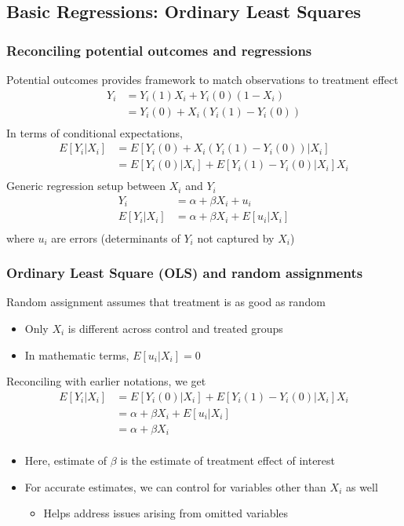 \documentclass[aspectratio=169]{beamer}
\begin{document}
\subsection{Basic Regressions: Ordinary Least Squares}
\begin{frame}
\frametitle{Reconciling potential outcomes and regressions} 
 Potential outcomes provides framework to match observations to treatment effect
\[ 
\begin{aligned}
Y_ i &= Y_i(1)X_i + Y_i(0)(1-X_i)\\
&=Y_i(0)+X_i(Y_i(1)-Y_i(0))\\
\end{aligned}
\]
In terms of conditional expectations, 
\[ 
\begin{aligned}
E[Y_ i|X_i ]&=E[Y_i(0)+X_i(Y_i(1)-Y_i(0)) |X_i]   \\
&=E[Y_i(0)|X_i]+E[Y_i(1)-Y_i(0)|X_i]X_i \\
\end{aligned}
\]
Generic regression setup between $X_i$ and $Y_i$
\[
\begin{aligned}
Y_i &=\alpha + \beta X_i + u_i   \\
E[Y_ i|X_i]&=\alpha + \beta X_i + E[u_i|X_i] \\
\end{aligned}
\]
where $u_i$ are errors (determinants of $Y_i$ not captured by $X_i$)
\end{frame}

\begin{frame}
\frametitle{Ordinary Least Square (OLS) and random assignments} 
Random assignment assumes that treatment is as good as random
\begin{itemize}\setlength\itemsep{3pt}
\item Only $X_i$ is different across control and treated groups
\item In mathematic terms, $E[u_i|X_i]=0$
\end{itemize} \medskip
Reconciling with earlier notations, we get
\[
\begin{aligned}
  E[Y_i|X_i]&=E[Y_i(0)|X_i]+E[Y_i(1)-Y_i(0)|X_i]X_i \\
          &=\alpha + \beta X_i + E[u_i|X_i]\\ 
          &=\alpha + \beta X_i\\ 
\end{aligned}
\] \vspace{-15pt}
\begin{itemize}\setlength\itemsep{3pt}
\item Here, estimate of $\beta$ is the estimate of treatment effect of interest 
\item For accurate estimates, we can control for variables other than $X_i$ as well
\begin{itemize}
  \item Helps address issues arising from omitted variables
\end{itemize}
\end{itemize}
\end{frame}
\end{document}
